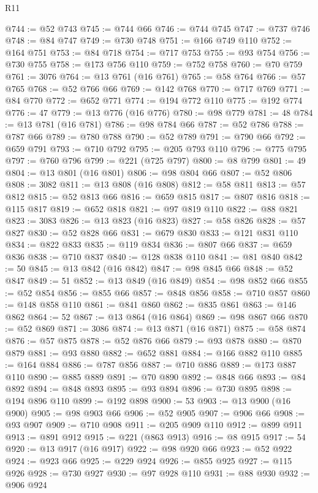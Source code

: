 \begin{lexlean}{R11}
\begin{coremodule}
@744 := @52 @743
@745 := @744 @66
@746 := @744 @745
@747 := @737 @746
@748 := @84 @747
@749 := @730 @748
@751 := @166 @749 @110
@752 := @164 @751
@753 := @84 @718
@754 := @717 @753
@755 := @93 @754
@756 := @730 @755
@758 := @173 @756 @110
@759 := @752 @758
@760 := @70 @759
@761 := 3076
@764 := @13 @761 (@16 @761)
@765 := @58 @764
@766 := @57 @765
@768 := @52 @766 @66
@769 := @142 @768
@770 := @717 @769
@771 := @84 @770
@772 := @652 @771
@774 := @194 @772 @110
@775 := @192 @774
@776 := 47
@779 := @13 @776 (@16 @776)
@780 := @98 @779
@781 := 48
@784 := @13 @781 (@16 @781)
@786 := @98 @784 @66
@787 := @52 @786
@788 := @787 @66
@789 := @780 @788
@790 := @52 @789
@791 := @790 @66
@792 := @659 @791
@793 := @710 @792
@795 := @205 @793 @110
@796 := @775 @795
@797 := @760 @796
@799 := @221 (@725 @797)
@800 := @8 @799
@801 := 49
@804 := @13 @801 (@16 @801)
@806 := @98 @804 @66
@807 := @52 @806
@808 := 3082
@811 := @13 @808 (@16 @808)
@812 := @58 @811
@813 := @57 @812
@815 := @52 @813 @66
@816 := @659 @815
@817 := @807 @816
@818 := @115 @817
@819 := @652 @818
@821 := @97 @819 @110
@822 := @88 @821
@823 := 3083
@826 := @13 @823 (@16 @823)
@827 := @58 @826
@828 := @57 @827
@830 := @52 @828 @66
@831 := @679 @830
@833 := @121 @831 @110
@834 := @822 @833
@835 := @119 @834
@836 := @807 @66
@837 := @659 @836
@838 := @710 @837
@840 := @128 @838 @110
@841 := @81 @840
@842 := 50
@845 := @13 @842 (@16 @842)
@847 := @98 @845 @66
@848 := @52 @847
@849 := 51
@852 := @13 @849 (@16 @849)
@854 := @98 @852 @66
@855 := @52 @854
@856 := @855 @66
@857 := @848 @856
@858 := @710 @857
@860 := @148 @858 @110
@861 := @841 @860
@862 := @835 @861
@863 := @146 @862
@864 := 52
@867 := @13 @864 (@16 @864)
@869 := @98 @867 @66
@870 := @52 @869
@871 := 3086
@874 := @13 @871 (@16 @871)
@875 := @58 @874
@876 := @57 @875
@878 := @52 @876 @66
@879 := @93 @878
@880 := @870 @879
@881 := @93 @880
@882 := @652 @881
@884 := @166 @882 @110
@885 := @164 @884
@886 := @787 @856
@887 := @710 @886
@889 := @173 @887 @110
@890 := @885 @889
@891 := @70 @890
@892 := @848 @66
@893 := @84 @892
@894 := @848 @893
@895 := @93 @894
@896 := @730 @895
@898 := @194 @896 @110
@899 := @192 @898
@900 := 53
@903 := @13 @900 (@16 @900)
@905 := @98 @903 @66
@906 := @52 @905
@907 := @906 @66
@908 := @93 @907
@909 := @710 @908
@911 := @205 @909 @110
@912 := @899 @911
@913 := @891 @912
@915 := @221 (@863 @913)
@916 := @8 @915
@917 := 54
@920 := @13 @917 (@16 @917)
@922 := @98 @920 @66
@923 := @52 @922
@924 := @923 @66
@925 := @229 @924
@926 := @855 @925
@927 := @115 @926
@928 := @730 @927
@930 := @97 @928 @110
@931 := @88 @930
@932 := @906 @924

\end{coremodule}
\end{lexlean}
